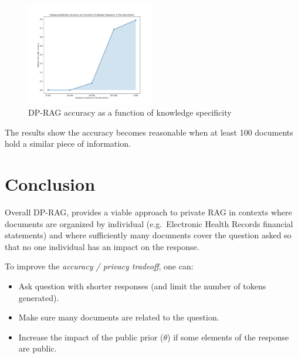 \documentclass[conference]{IEEEtran}
\begin{document}
\begin{figure}
\centering
\includegraphics[width=0.5\textwidth]{figures/accuracy.pdf}
\caption{DP-RAG accuracy as a function of knowledge
specificity}\label{fig:accuracy}
\end{figure}

The results show the accuracy becomes reasonable when at least 100
documents hold a similar piece of information.

\section{Conclusion}\label{conclusion}

Overall DP-RAG, provides a viable approach to private RAG in contexts
where documents are organized by individual (e.g.~Electronic Health
Records financial statements) and where sufficiently many documents
cover the question asked so that no one individual has an impact on the
response.

To improve the \emph{accuracy / privacy tradeoff}, one can:

\begin{itemize}

\item
  Ask question with shorter responses (and limit the number of tokens
  generated).
\item
  Make sure many documents are related to the question.
\item
  Increase the impact of the public prior (\(\theta\)) if some elements
  of the response are public.
\end{itemize}
\end{document}
